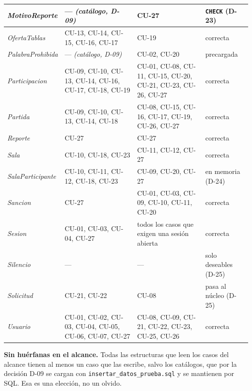 \begin{center}
\begin{longtable}{|L{0.215\textwidth}|L{0.26\textwidth}|L{0.235\textwidth}|L{0.15\textwidth}|}
\textit{MotivoReporte} & — \textit{(catálogo, \mbox{D-09})} & \mbox{CU-27} & \texttt{CHECK} (\mbox{D-23}) \\ \hline
\textit{OfertaTablas} & \mbox{CU-13}, \mbox{CU-14}, \mbox{CU-15}, \mbox{CU-16}, \mbox{CU-17} & \mbox{CU-19} & correcta \\ \hline
\textit{PalabraProhibida} & — \textit{(catálogo, \mbox{D-09})} & \mbox{CU-02}, \mbox{CU-20} & precargada \\ \hline
\textit{Participacion} & \mbox{CU-09}, \mbox{CU-10}, \mbox{CU-13}, \mbox{CU-14}, \mbox{CU-16}, \mbox{CU-17}, \mbox{CU-18}, \mbox{CU-19} & \mbox{CU-01}, \mbox{CU-08}, \mbox{CU-11}, \mbox{CU-15}, \mbox{CU-20}, \mbox{CU-21}, \mbox{CU-23}, \mbox{CU-26}, \mbox{CU-27} & correcta \\ \hline
\textit{Partida} & \mbox{CU-09}, \mbox{CU-10}, \mbox{CU-13}, \mbox{CU-14}, \mbox{CU-18} & \mbox{CU-08}, \mbox{CU-15}, \mbox{CU-16}, \mbox{CU-17}, \mbox{CU-19}, \mbox{CU-26}, \mbox{CU-27} & correcta \\ \hline
\textit{Reporte} & \mbox{CU-27} & \mbox{CU-27} & correcta \\ \hline
\textit{Sala} & \mbox{CU-10}, \mbox{CU-18}, \mbox{CU-23} & \mbox{CU-11}, \mbox{CU-12}, \mbox{CU-27} & correcta \\ \hline
\textit{SalaParticipante} & \mbox{CU-10}, \mbox{CU-11}, \mbox{CU-12}, \mbox{CU-18}, \mbox{CU-23} & \mbox{CU-09}, \mbox{CU-20}, \mbox{CU-27} & en memoria (\mbox{D-24}) \\ \hline
\textit{Sancion} & \mbox{CU-27} & \mbox{CU-01}, \mbox{CU-03}, \mbox{CU-09}, \mbox{CU-10}, \mbox{CU-11}, \mbox{CU-20} & correcta \\ \hline
\textit{Sesion} & \mbox{CU-01}, \mbox{CU-03}, \mbox{CU-04}, \mbox{CU-27} & todos los casos que exigen una sesión abierta & correcta \\ \hline
\textit{Silencio} & — & — & solo deseables (\mbox{D-25}) \\ \hline
\textit{Solicitud} & \mbox{CU-21}, \mbox{CU-22} & \mbox{CU-08} & pasa al núcleo (\mbox{D-25}) \\ \hline
\textit{Usuario} & \mbox{CU-01}, \mbox{CU-02}, \mbox{CU-03}, \mbox{CU-04}, \mbox{CU-05}, \mbox{CU-06}, \mbox{CU-07}, \mbox{CU-27} & \mbox{CU-08}, \mbox{CU-09}, \mbox{CU-21}, \mbox{CU-22}, \mbox{CU-23}, \mbox{CU-25}, \mbox{CU-26} & correcta \\ \hline
\end{longtable}
\end{center}

\textbf{Sin huérfanas en el alcance.} Todas las estructuras que leen los casos del alcance tienen al menos un caso que las escribe, salvo los catálogos, que por la decisión \mbox{D-09} se cargan con \texttt{insertar\_\allowbreak{}datos\_\allowbreak{}prueba.sql} y se mantienen por SQL. Esa es una elección, no un olvido.

